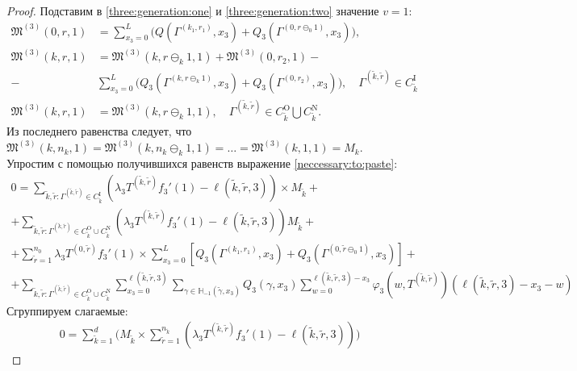 \documentclass{report}
\begin{document}
\begin{proof}
Подставим в \eqref{three:generation:one} и \eqref{three:generation:two} значение $v=1$:
\begin{align*}
    \mathfrak{M}^{(3)}(0,r,1) &= \sum_{x_3=0}^{L} \biggl(Q(\Gamma^{(k_1,r_1)}, x_3) + Q_3(\Gamma^{(0,r\ominus_{0}1)}, x_3) \biggr),\\
    \mathfrak{M}^{(3)}(k,r,1) &=\mathfrak{M}^{(3)}(k,r\ominus_{k}1,1) +\mathfrak{M}^{(3)}(0,r_2,1)-\\
    - &\sum_{x_3=0}^{L} \biggl(Q_3(\Gamma^{(k,r\ominus_{k}1)}, x_3) + Q_3(\Gamma^{(0,r_2)}, x_3) \biggr),  
    \quad \Gamma^{(\tilde{k}, \tilde{r})} \in C_{\tilde{k}}^{\mathrm{I}}\\
    \mathfrak{M}^{(3)}(k,r,1) &= \mathfrak{M}^{(3)}(k,r\ominus_k 1,1), \quad \Gamma^{(\tilde{k}, \tilde{r})} \in C_{\tilde{k}}^{\mathrm{O}} \bigcup C_{\tilde{k}}^{\mathrm{N}}.
\end{align*}
Из последнего равенства следует, что $ \mathfrak{M}^{(3)}(k,n_k,1) =  \mathfrak{M}^{(3)}(k,n_k\ominus_k 1,1) = \ldots =  \mathfrak{M}^{(3)}(k,1,1) = M_k$.
Упростим с помощью получившихся равенств выражение \eqref{neccessary:to:paste}:
\begin{multline}
 0 = \sum_{\tilde{k},\tilde{r}\colon \Gamma^{(\tilde{k}, \tilde{r})} \in C_{\tilde{k}}^{\mathrm{I}}} (\lambda_3 T^{(\tilde{k},\tilde{r})} f_3'(1) - \ell(\tilde{k},\tilde{r},3))
     \times   M_{\tilde{k}}
 +\\+ \sum_{\tilde{k},\tilde{r}\colon \Gamma^{(\tilde{k}, \tilde{r})} \in C_{\tilde{k}}^{\mathrm{O}}\cup C_{\tilde{k}}^{\mathrm{N}}} (\lambda_3 T^{(\tilde{k},\tilde{r})} f_3'(1) - \ell(\tilde{k},\tilde{r},3)) M_{\tilde{k}}   +\\+ \sum_{\tilde{r}=1}^{n_0} \lambda_3 T^{(0,\tilde{r})} f_3'(1)  \times \sum_{x_3=0}^{L} \left[ Q_3(\Gamma^{(k_1,r_1)},x_3) + Q_3(\Gamma^{(0,\tilde{r}\ominus_0 1)},x_3) \right]   +\\+  \sum_{\tilde{k},\tilde{r}\colon \Gamma^{(\tilde{k}, \tilde{r})} \in C_{\tilde{k}}^{\mathrm{O}}\cup C_{\tilde{k}}^{\mathrm{N}}} \sum_{x_3=0}^{\ell(\tilde{k},\tilde{r},3)}\sum_{\gamma \in {\mathbb H}_{-1}(\tilde{\gamma},x_3)} Q_3(\gamma,x_3) \sum_{w=0}^{\ell(\tilde{k},\tilde{r},3) - x_3} \varphi_3(w,T^{(\tilde{k},\tilde{r})}) (\ell(\tilde{k},\tilde{r},3)-x_3 - w)
 \label{neccessary:to:paste:one}
\end{multline}
Сгруппируем слагаемые:
\begin{multline}
 0 = \sum_{\tilde{k} = 1}^d \biggl( M_{\tilde{k}} \times \sum_{\tilde{r} = 1}^{n_{\tilde{k}}} (\lambda_3 T^{(\tilde{k},\tilde{r})} f_3'(1) - \ell(\tilde{k},\tilde{r},3))\biggr)

\end{multline}
\end{proof}
\end{document}
